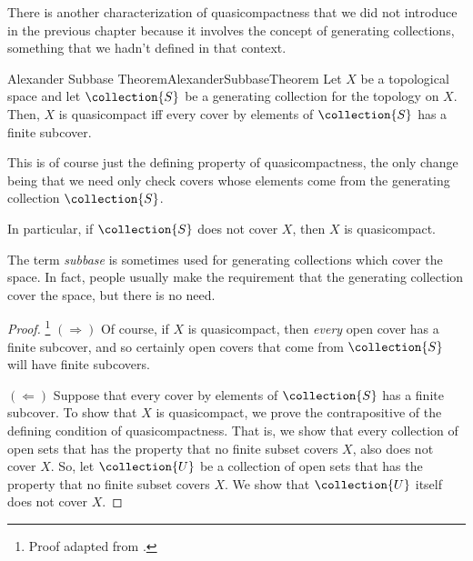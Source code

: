 There is another characterization of quasicompactness that we did not introduce in the previous chapter because it involves the concept of generating collections, something that we hadn't defined in that context.
\begin{thm}{Alexander Subbase Theorem}{AlexanderSubbaseTheorem}
Let $X$ be a topological space and let $\collection{S}$ be a generating collection for the topology on $X$.  Then, $X$ is quasicompact iff every cover by elements of $\collection{S}$ has a finite subcover.
\begin{rmk}
This is of course just the defining property of quasicompactness, the only change being that we need only check covers whose elements come from the generating collection $\collection{S}$.
\end{rmk}
\begin{rmk}
In particular, if $\collection{S}$ does not cover $X$, then $X$ is quasicompact.
\end{rmk}
\begin{rmk}
The term \emph{subbase} is sometimes used for generating collections which cover the space.  In fact, people usually make the requirement that the generating collection cover the space, but there is no need.
\end{rmk}
\begin{proof}\footnote{Proof adapted from \cite[pg.~139]{Kelley}.}
$(\Rightarrow )$ Of course, if $X$ is quasicompact, then \emph{every} open cover has a finite subcover, and so certainly open covers that come from $\collection{S}$ will have finite subcovers.

\blankline
\noindent
$(\Leftarrow )$ 
Suppose that every cover by elements of $\collection{S}$ has a finite subcover.  To show that $X$ is quasicompact, we prove the contrapositive of the defining condition of quasicompactness.  That is, we show that every collection of open sets that has the property that no finite subset covers $X$, also does not cover $X$.  So, let $\collection{U}$ be a collection of open sets that has the property that no finite subset covers $X$.  We show that $\collection{U}$ itself does not cover $X$.


\end{proof}
\end{thm}
